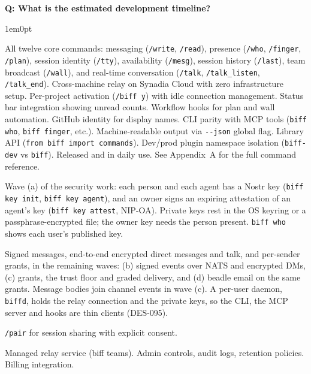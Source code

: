 \documentclass[11pt,letterpaper]{article}
\newcounter{faqnum}
\newenvironment{faqpair}[1]{%
  \needspace{4\baselineskip}%
  \vspace{0.5em}%
  \refstepcounter{faqnum}%
  \noindent\textbf{\color{SectionBlue}Q\thefaqnum: #1}\par\nopagebreak[4]%
  \vspace{0.2em}%
  \begin{adjustwidth}{1em}{0pt}%
  \setlength{\parindent}{0pt}%
}{%
  \end{adjustwidth}%
  \vspace{0.5em}%
}
\begin{document}
\begin{faqpair}{What is the estimated development timeline?}\label{faq:timeline}
  \begin{description}[leftmargin=1.5em, labelwidth=10em, font=\bfseries]
    \item[Shipped] All twelve core commands: messaging (\texttt{/write},
    \texttt{/read}), presence (\texttt{/who}, \texttt{/finger},
    \texttt{/plan}), session identity (\texttt{/tty}), availability
    (\texttt{/mesg}), session history (\texttt{/last}), team broadcast
    (\texttt{/wall}), and real-time conversation (\texttt{/talk},
    \texttt{/talk\_listen}, \texttt{/talk\_end}). Cross-machine relay on
    Synadia Cloud with zero infrastructure setup. Per-project activation
    (\texttt{/biff y}) with idle connection management. Status bar
    integration showing unread counts. Workflow hooks for plan and wall
    automation. GitHub identity for display names. CLI parity with MCP
    tools (\texttt{biff who}, \texttt{biff finger}, etc.). Machine-readable
    output via \texttt{-{}-json} global flag. Library API
    (\texttt{from biff import commands}). Dev/prod plugin namespace
    isolation (\texttt{biff-dev} vs \texttt{biff}). Released and in daily
    use. See Appendix~A for the full command reference.
    \item[Shipped: Keys] Wave (a) of the security work: each person and each
    agent has a Nostr key (\texttt{biff key init}, \texttt{biff key agent}),
    and an owner signs an expiring attestation of an agent's key
    (\texttt{biff key attest}, NIP-OA). Private keys rest in the OS keyring or
    a passphrase-encrypted file; the owner key needs the person present.
    \texttt{biff who} shows each user's published key.
    \item[Future: Security] Signed messages, end-to-end encrypted direct
    messages and talk, and per-sender grants, in the remaining waves:
    (b) signed events over NATS and encrypted DMs, (c) grants, the trust floor
    and graded delivery, and (d) beadle email on the same grants. Message
    bodies join channel events in wave (c). A per-user daemon, \texttt{biffd}, holds the relay
    connection and the private keys, so the CLI, the MCP server and hooks
    are thin clients (DES-095).
    \item[Future: Real-Time] \texttt{/pair} for session sharing with
    explicit consent.
    \item[Future: Hosted] Managed relay service (biff teams). Admin
    controls, audit logs, retention policies. Billing integration.
  \end{description}
\end{faqpair}
\end{document}
